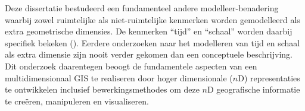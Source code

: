 {Deze dissertatie bestudeerd een fundamenteel andere modelleer-benadering waarbij zowel ruimtelijke als niet-ruimtelijke kenmerken worden gemodelleerd als extra geometrische dimensies.
De kenmerken ``tijd'' en ``schaal'' worden daarbij specifiek bekeken ().
Eerdere onderzoeken naar het modelleren van tijd en schaal als extra dimensie zijn nooit verder gekomen dan een conceptuele beschrijving.
Dit onderzoek daarentegen beoogt de fundamentele aspecten van een multidimensionaal GIS te realiseren door hoger dimensionale ($n$D) representaties te ontwikkelen inclusief bewerkingsmethodes om deze $n$D geografische informatie te creëren, manipuleren en visualiseren.
}
